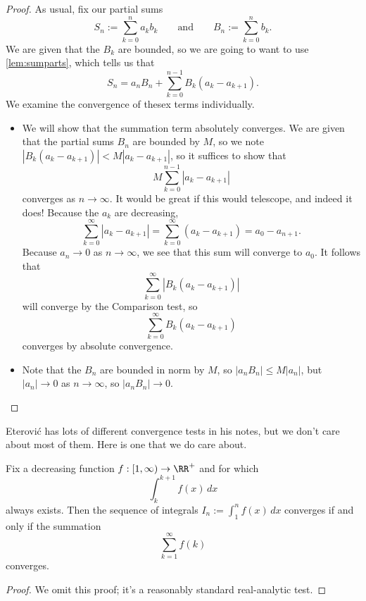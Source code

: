 \begin{proof}
	As usual, fix our partial sums
	\[S_n:=\sum_{k=0}^na_kb_k\qquad\text{and}\qquad B_n:=\sum_{k=0}^nb_k.\]
	We are given that the $B_k$ are bounded, so we are going to want to use \autoref{lem:sumparts}, which tells us that
	\[S_n=a_nB_n+\sum_{k=0}^{n-1}B_k(a_k-a_{k+1}).\]
	We examine the convergence of thesex terms individually.
	\begin{itemize}
		\item We will show that the summation term absolutely converges. We are given that the partial sums $B_n$ are bounded by $M$, so we note $|B_k(a_k-a_{k+1})|<M|a_k-a_{k+1}|$, so it suffices to show that
		\[M\sum_{k=0}^{n-1}\left|a_k-a_{k+1}\right|\]
		converges as $n\to\infty$. It would be great if this would telescope, and indeed it does! Because the $a_k$ are decreasing,
		\[\sum_{k=0}^\infty|a_k-a_{k+1}|=\sum_{k=0}^\infty(a_k-a_{k+1})=a_0-a_{n+1}.\]
		Because $a_n\to0$ as $n\to\infty$, we see that this sum will converge to $a_0$. It follows that
		\[\sum_{k=0}^\infty|B_k(a_k-a_{k+1})|\]
		will converge by the Comparison test, so
		\[\sum_{k=0}^\infty B_k(a_k-a_{k+1})\]
		converges by absolute convergence.
		\item Note that the $B_n$ are bounded in norm by $M$, so $|a_nB_n|\le M|a_n|$, but $|a_n|\to0$ as $n\to\infty$, so $|a_nB_n|\to0$.
		\qedhere
	\end{itemize}
\end{proof}
Eterovi\'c has lots of different convergence tests in his notes, but we don't care about most of them. Here is one that we do care about.
\begin{theorem}
	Fix a decreasing function $f:\left[1,\infty\right)\to\RR^+$ and for which
	\[\int_k^{k+1}f(x)\,dx\]
	always exists. Then the sequence of integrals $I_n:=\int_1^nf(x)\,dx$ converges if and only if the summation
	\[\sum_{k=1}^\infty f(k)\]
	converges.
\end{theorem}
\begin{proof}
	We omit this proof; it's a reasonably standard real-analytic test.
\end{proof}